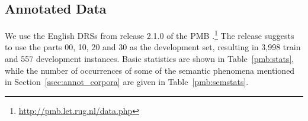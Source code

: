 \documentclass[11pt,a4paper]{article}
\begin{document}
\subsection{Annotated Data}
\label{ssec:data}

We use the English DRSs from release 2.1.0 of the PMB \cite{PMBshort:2017}.\footnote{\url{http://pmb.let.rug.nl/data.php}} 
The release suggests to use the parts 00, 10, 20 and 30 as the development set, resulting in 3,998 train and 557 development instances. 
Basic statistics are shown in Table~\ref{pmb:stats}, while the number of occurrences of some of the semantic phenomena mentioned in Section~\ref{ssec:annot_corpora} are given in Table~\ref{pmb:semstats}. 

\begin{table}[t]
\centering
{}
\caption{Number of documents, sentences and tokens for the English part of PMB release 2.1.0. Note that the number of tokens is based on the PMB tokenization, treating multi-word expressions as a single token.}
\label{pmb:stats}
\end{table}


\begin{table}[t]
\centering 
{}
\caption[]{Counts of relevant semantic phenomena for PMB release 2.1.0.\footnotemark{}
These phenomena are described and further discussed in Section\,\ref{sec:manual}.}
\label{pmb:semstats}
\end{table}
\end{document}
